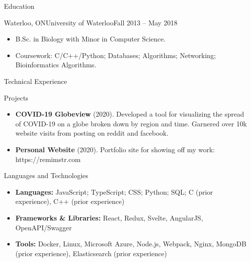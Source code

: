 \documentclass[]{mcdowellcv}
\begin{document}
	\begin{cvsection}{Education}
		\begin{cvsubsection}{Waterloo, ON}{University of Waterloo}{Fall 2013 -- May 2018}
			\begin{itemize}
				\item B.Sc. in Biology with Minor in Computer Science.
				\item Coursework: C/C++/Python; Databases; Algorithms; Networking; Bioinformatics Algorithms.
			\end{itemize}
		\end{cvsubsection}
	\end{cvsection}
	
	\begin{cvsection}{Technical Experience}
		\begin{cvsubsection}{Projects}{}{}
			\begin{itemize}
				\item \textbf{COVID-19 Globeview} (2020). Developed a tool for visualizing the spread of COVID-19 on a globe broken down by region and time. Garnered over 10k website visits from posting on reddit and facebook.
				\item \textbf{Personal Website} (2020). Portfolio site for showing off my work: https://remimstr.com
			\end{itemize}
		\end{cvsubsection}
	\end{cvsection}
	
	\begin{cvsection}{Languages and Technologies}
		\begin{cvsubsection}{}{}{}	
			\begin{itemize}
				\item \textbf{Languages:} JavaScript; TypeScript; CSS; Python; SQL; C (prior experience), C++ (prior experience)
				\item \textbf{Frameworks \& Libraries:} React, Redux, Svelte, AngularJS, OpenAPI/Swagger
				\item \textbf{Tools:} Docker, Linux, Microsoft Azure, Node.js, Webpack, Nginx, MongoDB (prior experience), Elasticsearch (prior experience)
			\end{itemize}
		\end{cvsubsection}
	\end{cvsection}
	
\end{document}

